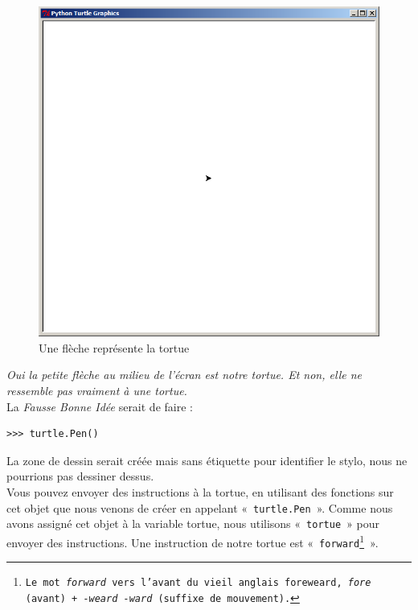 \begin{figure}[ht!]
\centering
\includegraphics[scale=0.4]{images/turtle_debut.png}
\caption{Une flèche représente la tortue}
\label{fig:turtledebut}
\end{figure}

\emph{Oui la petite flèche au milieu de l'écran est notre tortue. Et non, elle ne ressemble pas vraiment à une tortue.}\\

La \emph{Fausse Bonne Idée} serait de faire :

\begin{Verbatim}[frame=single,rulecolor=\color{red}, label=erreur]
>>> turtle.Pen()
\end{Verbatim}

La zone de dessin serait créée mais sans étiquette pour identifier le stylo, nous ne pourrions pas dessiner dessus.\\


Vous pouvez envoyer des instructions à la tortue, en utilisant des fonctions sur cet objet que nous venons de créer en appelant «~\texttt{turtle.Pen}~». Comme nous avons assigné cet objet à la variable tortue, nous utilisons «~\texttt{tortue}~» pour envoyer des instructions. Une instruction de notre tortue est «~\texttt{forward\footnote{Le mot \emph{forward} vers l'avant du vieil anglais foreweard,  \emph{fore} (avant) + \emph{-weard -ward} (suffixe de mouvement).}}~».

